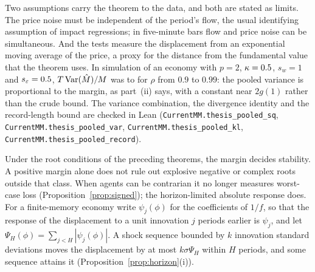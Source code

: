 Two assumptions carry the theorem to the data, and both are stated as limits. The price noise must be independent of the period's flow, the usual identifying assumption of impact regressions; in five-minute bars flow and price noise can be simultaneous. And the tests measure the displacement from an exponential moving average of the price, a proxy for the distance from the fundamental value that the theorem uses. In simulation of an economy with $p=2$, $\kappa=0.5$, $s_w=1$ and $s_\varepsilon=0.5$, $T\,{\rm Var}(\hat M)/M$ was \PooledRatioLo{} to \PooledRatioHi{} for $\rho$ from $0.9$ to $0.99$: the pooled variance is proportional to the margin, as part~(ii) says, with a constant near $2g(1)$ rather than the crude bound. The variance combination, the divergence identity and the record-length bound are checked in Lean (\nolinkurl{CurrentMM.thesis_pooled_sq}, \nolinkurl{CurrentMM.thesis_pooled_var}, \nolinkurl{CurrentMM.thesis_pooled_kl}, \nolinkurl{CurrentMM.thesis_pooled_record}).

Under the root conditions of the preceding theorems, the margin decides stability. A positive margin alone does not rule out explosive negative or complex roots outside that class. When agents can be contrarian it no longer measures worst-case loss (Proposition~\ref{prop:signed}); the horizon-limited absolute response does. For a finite-memory economy write $\psi_j(\phi)$ for the coefficients of $1/f$, so that the response of the displacement to a unit innovation $j$ periods earlier is $\psi_j$, and let $\Psi_H(\phi)=\sum_{j<H}|\psi_j(\phi)|$. A shock sequence bounded by $k$ innovation standard deviations moves the displacement by at most $k\sigma\Psi_H$ within $H$ periods, and some sequence attains it (Proposition~\ref{prop:horizon}(i)).

